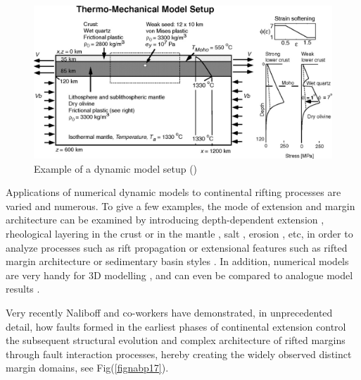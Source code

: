 \documentclass[a4paper]{article}
\begin{document}
\begin{figure}[h!]
\centering
\includegraphics[width=15cm]{images/Lfig4.jpg}
\caption{Example of a dynamic model setup (\cite{hube03})}
\label{DynamModel}
\end{figure}

Applications of numerical dynamic models to continental rifting processes are varied and numerous. To give a few examples, the mode of extension and margin architecture can be examined by introducing depth-dependent extension \cite{hube08,hube11}, rheological layering in the crust \cite{wiwg05} or in the mantle \cite{lige14}, salt \cite{albs10,albe15}, erosion \cite{bupo01}, etc, in order to analyze processes such as rift propagation \cite{wibl05} or extensional features such as rifted margin architecture \cite{wulc15} or sedimentary basin styles \cite{buhb08}. In addition, numerical models are very handy for 3D modelling \cite{alht11,alht12,alhf13}, and can even be compared to analogue model results \cite{bube06}. 

Very recently Naliboff and co-workers have demonstrated, in unprecedented detail, how faults formed in the earliest phases of continental extension control the subsequent structural evolution and complex architecture of rifted margins through fault interaction processes, hereby creating the widely observed distinct margin domains, see Fig(\ref{fignabp17}).
\end{document}
